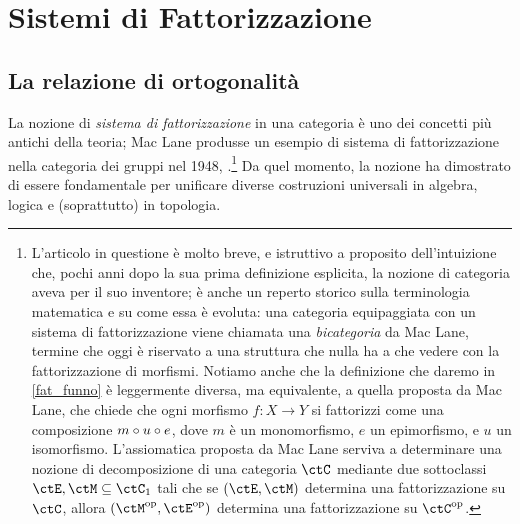 \label{cap:fattorizzazione}
\chapter{Sistemi di Fattorizzazione}
\section{La relazione di ortogonalità}
La nozione di \emph{sistema di fattorizzazione} in una categoria è uno dei concetti più antichi della teoria; Mac Lane produsse un esempio di sistema di fattorizzazione nella categoria dei gruppi nel 1948, \cite{maclane_grp_duality}.\footnote{L'articolo in questione è molto breve, e istruttivo a proposito dell'intuizione che, pochi anni dopo la sua prima definizione esplicita, la nozione di categoria aveva per il suo inventore; è anche un reperto storico sulla terminologia matematica e su come essa è evoluta: una categoria equipaggiata con un sistema di fattorizzazione viene chiamata una \emph{bicategoria} da Mac Lane, termine che oggi è riservato a una struttura che nulla ha a che vedere con la fattorizzazione di morfismi. Notiamo anche che la definizione che daremo in \ref{fat_funno} è leggermente diversa, ma equivalente, a quella proposta da Mac Lane, che chiede che ogni morfismo \(f : X\to Y\) si fattorizzi come una composizione \(m\circ u\circ e\), dove \(m\) è un monomorfismo, \(e\) un epimorfismo, e \(u\) un isomorfismo. L'assiomatica proposta da Mac Lane serviva a determinare una nozione di decomposizione di una categoria \(\ctC\) mediante due sottoclassi \(\ctE,\ctM\subseteq\ctC_1\) tali che se \((\ctE,\ctM)\) determina una fattorizzazione su \(\ctC\), allora \((\ctM^\op,\ctE^\op)\) determina una fattorizzazione su \(\ctC^\op\).} Da quel momento, la nozione ha dimostrato di essere fondamentale per unificare diverse costruzioni universali in algebra, logica e (soprattutto) in topologia.

